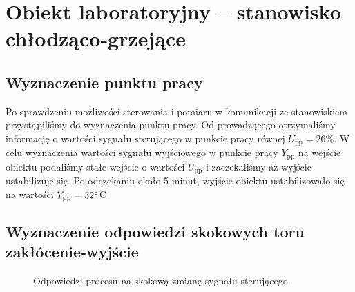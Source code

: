 \chapter{Obiekt laboratoryjny -- stanowisko chłodząco-grzejące}
\label{lab1}

\section{Wyznaczenie punktu pracy}
\label{lab1_punkt_pracy}

Po sprawdzeniu możliwości sterowania i pomiaru w komunikacji ze stanowiskiem przystąpiliśmy do wyznaczenia punktu pracy.
Od prowadzącego otrzymaliśmy informację o wartości sygnału sterującego w punkcie pracy 
równej $U_{\mathrm{pp}} = 26\%$. W celu wyznaczenia wartości sygnału wyjściowego w 
punkcie pracy $Y_{\mathrm{pp}}$ na wejście obiektu podaliśmy stałe wejście o wartości 
$U_{\mathrm{pp}}$ i zaczekaliśmy aż wyjście ustabilizuje się. Po odczekaniu około 5 minut,
wyjście obiektu ustabilizowało się na wartości $Y_{\mathrm{pp}} = \num{32} \degree $C


\section{Wyznaczenie odpowiedzi skokowych toru zakłócenie-wyjście}
\label{lab1_odpowiedzi}


\begin{figure}[t]
    \centering
    \caption{Odpowiedzi procesu na skokową zmianę sygnału sterującego}
    \label{zad2_porow_odp_skok}
\end{figure}